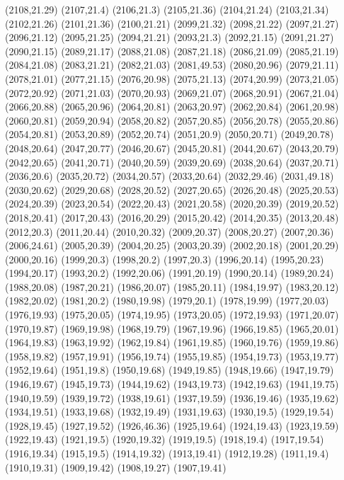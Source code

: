 (2108,21.29)
(2107,21.4)
(2106,21.3)
(2105,21.36)
(2104,21.24)
(2103,21.34)
(2102,21.26)
(2101,21.36)
(2100,21.21)
(2099,21.32)
(2098,21.22)
(2097,21.27)
(2096,21.12)
(2095,21.25)
(2094,21.21)
(2093,21.3)
(2092,21.15)
(2091,21.27)
(2090,21.15)
(2089,21.17)
(2088,21.08)
(2087,21.18)
(2086,21.09)
(2085,21.19)
(2084,21.08)
(2083,21.21)
(2082,21.03)
(2081,49.53)
(2080,20.96)
(2079,21.11)
(2078,21.01)
(2077,21.15)
(2076,20.98)
(2075,21.13)
(2074,20.99)
(2073,21.05)
(2072,20.92)
(2071,21.03)
(2070,20.93)
(2069,21.07)
(2068,20.91)
(2067,21.04)
(2066,20.88)
(2065,20.96)
(2064,20.81)
(2063,20.97)
(2062,20.84)
(2061,20.98)
(2060,20.81)
(2059,20.94)
(2058,20.82)
(2057,20.85)
(2056,20.78)
(2055,20.86)
(2054,20.81)
(2053,20.89)
(2052,20.74)
(2051,20.9)
(2050,20.71)
(2049,20.78)
(2048,20.64)
(2047,20.77)
(2046,20.67)
(2045,20.81)
(2044,20.67)
(2043,20.79)
(2042,20.65)
(2041,20.71)
(2040,20.59)
(2039,20.69)
(2038,20.64)
(2037,20.71)
(2036,20.6)
(2035,20.72)
(2034,20.57)
(2033,20.64)
(2032,29.46)
(2031,49.18)
(2030,20.62)
(2029,20.68)
(2028,20.52)
(2027,20.65)
(2026,20.48)
(2025,20.53)
(2024,20.39)
(2023,20.54)
(2022,20.43)
(2021,20.58)
(2020,20.39)
(2019,20.52)
(2018,20.41)
(2017,20.43)
(2016,20.29)
(2015,20.42)
(2014,20.35)
(2013,20.48)
(2012,20.3)
(2011,20.44)
(2010,20.32)
(2009,20.37)
(2008,20.27)
(2007,20.36)
(2006,24.61)
(2005,20.39)
(2004,20.25)
(2003,20.39)
(2002,20.18)
(2001,20.29)
(2000,20.16)
(1999,20.3)
(1998,20.2)
(1997,20.3)
(1996,20.14)
(1995,20.23)
(1994,20.17)
(1993,20.2)
(1992,20.06)
(1991,20.19)
(1990,20.14)
(1989,20.24)
(1988,20.08)
(1987,20.21)
(1986,20.07)
(1985,20.11)
(1984,19.97)
(1983,20.12)
(1982,20.02)
(1981,20.2)
(1980,19.98)
(1979,20.1)
(1978,19.99)
(1977,20.03)
(1976,19.93)
(1975,20.05)
(1974,19.95)
(1973,20.05)
(1972,19.93)
(1971,20.07)
(1970,19.87)
(1969,19.98)
(1968,19.79)
(1967,19.96)
(1966,19.85)
(1965,20.01)
(1964,19.83)
(1963,19.92)
(1962,19.84)
(1961,19.85)
(1960,19.76)
(1959,19.86)
(1958,19.82)
(1957,19.91)
(1956,19.74)
(1955,19.85)
(1954,19.73)
(1953,19.77)
(1952,19.64)
(1951,19.8)
(1950,19.68)
(1949,19.85)
(1948,19.66)
(1947,19.79)
(1946,19.67)
(1945,19.73)
(1944,19.62)
(1943,19.73)
(1942,19.63)
(1941,19.75)
(1940,19.59)
(1939,19.72)
(1938,19.61)
(1937,19.59)
(1936,19.46)
(1935,19.62)
(1934,19.51)
(1933,19.68)
(1932,19.49)
(1931,19.63)
(1930,19.5)
(1929,19.54)
(1928,19.45)
(1927,19.52)
(1926,46.36)
(1925,19.64)
(1924,19.43)
(1923,19.59)
(1922,19.43)
(1921,19.5)
(1920,19.32)
(1919,19.5)
(1918,19.4)
(1917,19.54)
(1916,19.34)
(1915,19.5)
(1914,19.32)
(1913,19.41)
(1912,19.28)
(1911,19.4)
(1910,19.31)
(1909,19.42)
(1908,19.27)
(1907,19.41)

